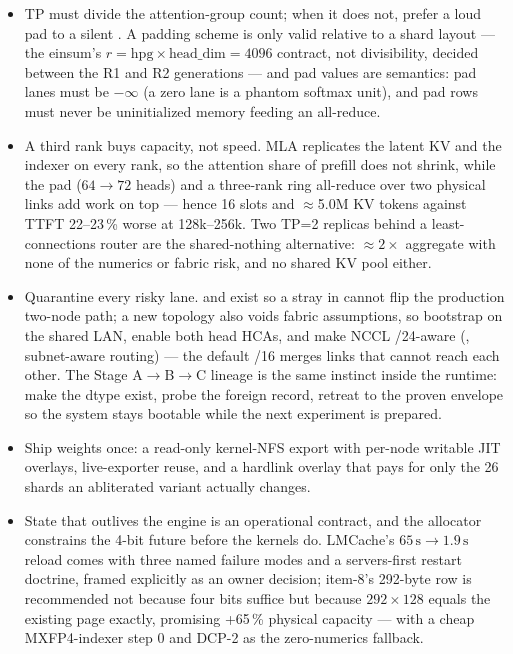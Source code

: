 \begin{itemize}
\item TP must divide the attention-group count; when it does not, prefer a
loud pad to a silent . A padding scheme is only valid
relative to a shard layout --- the  einsum's
$r = \text{hpg} \times \text{head\_dim} = 4096$ contract, not divisibility,
decided between the R1 and R2 generations --- and pad values are semantics:
 pad lanes must be $-\infty$ (a zero lane is a phantom
softmax unit), and pad rows must never be uninitialized memory feeding an
all-reduce.
\item A third rank buys capacity, not speed. MLA replicates the latent KV
and the indexer on every rank, so the attention share of prefill does not
shrink, while the pad ($64 \to 72$ heads) and a three-rank ring all-reduce
over two physical links add work on top --- hence 16 slots and
$\approx$5.0M KV tokens against TTFT 22--23\,\% worse at 128k--256k. Two
TP=2 replicas behind a least-connections router are the shared-nothing
alternative: $\approx 2\times$ aggregate with none of the numerics or
fabric risk, and no shared KV pool either.
\item Quarantine every risky lane.  and
 exist so a stray  in
 cannot flip the production two-node path; a new
topology also voids fabric assumptions, so bootstrap on the shared LAN,
enable both head HCAs, and make NCCL /24-aware
(, subnet-aware routing) --- the default /16 merges
links that cannot reach each other. The Stage A$\to$B$\to$C lineage is the
same instinct inside the runtime: make the dtype exist, probe the foreign
record, retreat to the proven envelope so the system stays bootable while
the next experiment is prepared.
\item Ship weights once: a read-only kernel-NFS export with per-node writable
JIT overlays, live-exporter reuse, and a hardlink overlay that pays for only
the 26 shards an abliterated variant actually changes.
\item State that outlives the engine is an operational contract, and the
allocator constrains the 4-bit future before the kernels do. LMCache's
$65\,\mathrm{s} \to 1.9\,\mathrm{s}$ reload comes with three named failure
modes and a servers-first restart doctrine, framed explicitly as an owner
decision; item-8's 292-byte row is recommended not because four bits
suffice but because $292 \times 128$ equals the existing page exactly,
promising +65\,\% physical capacity --- with a cheap MXFP4-indexer step 0
and DCP-2 as the zero-numerics fallback.
\end{itemize}

